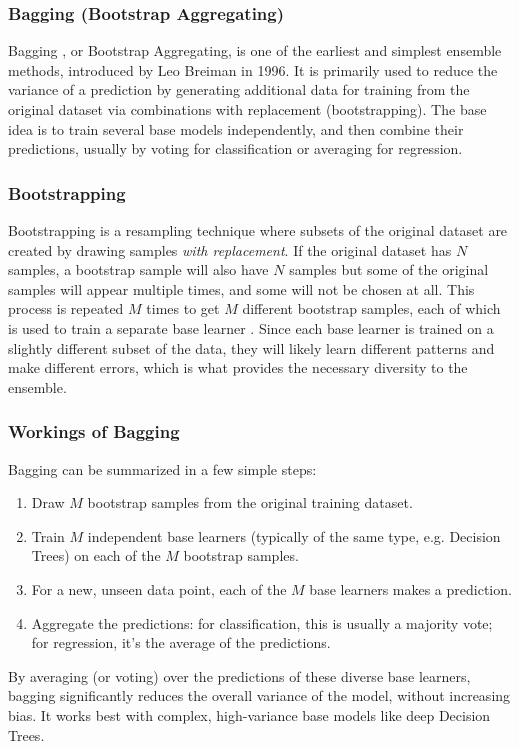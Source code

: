 \subsubsection{Bagging (Bootstrap Aggregating)} 
Bagging , or Bootstrap Aggregating, is one of the earliest and simplest ensemble methods, introduced by Leo Breiman in 1996. It is primarily used to reduce the variance of a prediction by generating additional data for training from the original dataset via combinations with replacement (bootstrapping). The base idea is to train several base models independently, and then combine their predictions, usually by voting for classification or averaging for regression.

\subsubsection{Bootstrapping} 
Bootstrapping is a resampling technique where subsets of the original dataset are created by drawing samples \textit{with replacement}. If the original dataset has $N$ samples, a bootstrap sample will also have $N$ samples but some of the original samples will appear multiple times, and some will not be chosen at all. This process is repeated $M$ times to get $M$ different bootstrap samples, each of which is used to train a separate base learner \parencite{agrawal2021survey}. Since each base learner is trained on a slightly different subset of the data, they will likely learn different patterns and make different errors, which is what provides the necessary diversity to the ensemble.

\subsubsection{Workings of Bagging} 
Bagging can be summarized in a few simple steps:
\begin{enumerate}[noitemsep] 
\item Draw $M$ bootstrap samples from the original training dataset.
\item Train $M$ independent base learners (typically of the same type, e.g. Decision Trees) on each of the $M$ bootstrap samples.
\item For a new, unseen data point, each of the $M$ base learners makes a prediction.
\item Aggregate the predictions: for classification, this is usually a majority vote; for regression, it's the average of the predictions.
\end{enumerate} 
By averaging (or voting) over the predictions of these diverse base learners, bagging significantly reduces the overall variance of the model, without increasing bias. It works best with complex, high-variance base models like deep Decision Trees.

